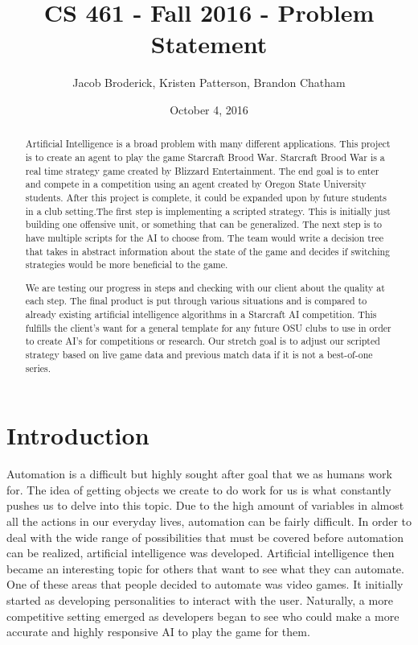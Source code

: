 \documentclass[10pt,letterpaper,onecolumn,draftclsnofoot]{IEEEtran}
\begin{document}
\begin{titlepage}
  \title{CS 461 - Fall 2016 - Problem Statement}
  \author{Jacob Broderick, Kristen Patterson, Brandon Chatham}
  \date{October 4, 2016}
  \maketitle
  \vspace{4cm}
  \begin{abstract}
  	\noindent 
  	Artificial Intelligence is a broad problem with many different applications. This project is to create an agent to play the game Starcraft Brood War. Starcraft Brood War is a real time strategy game created by Blizzard Entertainment. The end goal is to enter and compete in a competition using an agent created by Oregon State University students. After this project is complete, it could be expanded upon by future students in a club setting.The first step is implementing a scripted strategy. This is initially just building one offensive unit, or something that can be generalized. The next step is to have multiple scripts for the AI to choose from. The team would write a decision tree that takes in abstract information about the state of the game and decides if switching strategies would be more beneficial to the game.
  	
  	We are testing our progress in steps and checking with our client about the quality at each step. The final product is put through various situations and is compared to already existing artificial intelligence algorithms in a Starcraft AI competition. This fulfills the client's want for a general template for any future OSU clubs to use in order to create AI's for competitions or research. Our stretch goal is to adjust our scripted strategy based on live game data and previous match data if it is not a best-of-one series. 
  \end{abstract}
\end{titlepage}
\section{Introduction}
Automation is a difficult but highly sought after goal that we as humans work for. The idea of getting objects we create to do work for us is what constantly pushes us to delve into this topic. Due to the high amount of variables in almost all the actions in our everyday lives, automation can be fairly difficult. In order to deal with the wide range of possibilities that must be covered before automation can be realized, artificial intelligence was developed. Artificial intelligence then became an interesting topic for others that want to see what they can automate. One of these areas that people decided to automate was video games. It initially started as developing personalities to interact with the user. Naturally, a more competitive setting emerged as developers began to see who could make a more accurate and highly responsive AI to play the game for them.
\end{document}
